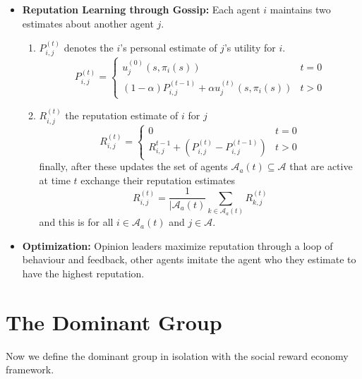 \documentclass[12pt]{article}
\begin{document}
\begin{itemize}
    \item \textbf{Reputation Learning through Gossip:} Each agent $i$ maintains two estimates about another agent $j$.
    \begin{enumerate}
        \item[(1)] $P^{(t)}_{i, j}$ denotes the $i$'s personal estimate of $j$'s utility for $i$.
        \[ P^{(t)}_{i, j} = \begin{cases}
                u^{(0)}_{j}(s, \pi_i(s)) & t = 0 \\
                (1 - \alpha)P_{i, j}^{(t-1)} + \alpha u_j^{(t)}(s, \pi_i(s)) & t > 0
        \end{cases} \]
        \item[(2)] $R^{(t)}_{i, j}$ the reputation estimate of $i$ for $j$
        \[ R^{(t)}_{i, j} = \begin{cases}
            0 & t = 0 \\
            R_{i, j}^{t - 1} + (P_{i, j}^{(t)} - P_{i, j}^{(t-1)}) & t > 0
        \end{cases} \]
        finally, after these updates the set of agents $\mathcal A_{a}(t) \subseteq \mathcal A$
        that are active at time $t$ exchange their reputation estimates
        \[ R_{i, j}^{(t)} = \frac{1}{|\mathcal A_{a}(t)}\sum_{k \in \mathcal A_a(t)}R^{(t)}_{k, j} \]
        and this is for all $i \in \mathcal A_{a}(t)$ and $j \in \mathcal A$.
    \end{enumerate}

    \item \textbf{Optimization:} Opinion leaders maximize reputation through a loop
    of behaviour and feedback, other agents imitate the agent who they estimate to have the highest
    reputation.
\end{itemize}

\section{The Dominant Group}
Now we define the dominant group in isolation with the social reward economy framework.
\end{document}
